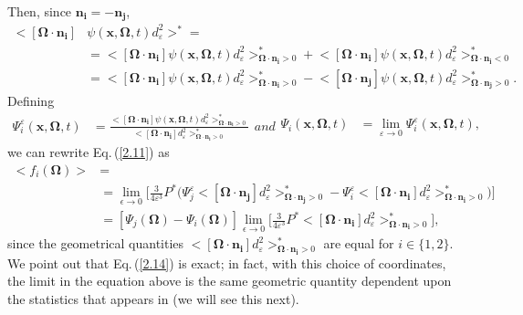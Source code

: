 \documentclass[12pt]{article}
\newcommand{\ep}{\varepsilon}
\newcommand{\bl}{\big<}
\newcommand{\bg}{\big>}
\begin{document}
Then, since $\bm{n_i} = -\bm{n_j}$,
\begin{equation}
\begin{split}
\bigg<[\bm\Omega\cdot\bm{n_i}]
&\psi(\bm x,\bm\Omega,t) d_{\ep}^2 \bigg>^* =
\\& = \bigg<[\bm\Omega\cdot\bm{n_i}]
\psi(\bm x,\bm\Omega,t) d_{\ep}^2 \bigg>_{\bm\Omega\cdot\bm{n_i}>0}^*+
 \bigg<[\bm\Omega\cdot\bm{n_i}]
\psi(\bm x,\bm\Omega,t) d_{\ep}^2 \bigg>_{\bm\Omega\cdot\bm{n_i}<0}^*
\\& = \bigg<[\bm\Omega\cdot\bm{n_i}]
\psi(\bm x,\bm\Omega,t) d_{\ep}^2 \bigg>_{\bm\Omega\cdot\bm{n_i}>0}^*-
 \bigg<[\bm\Omega\cdot\bm{n_j}]
\psi(\bm x,\bm\Omega,t) d_{\ep}^2 \bigg>_{\bm\Omega\cdot\bm{n_j}>0}^*.
\end{split}
\end{equation}
Defining
\begin{subequations}
\begin{align}
\Psi_i^{\ep}(\bm x,\bm\Omega,t) &= \frac{\bl[\bm\Omega\cdot\bm{n_i}]\psi(\bm x,\bm\Omega,t)
d_{\ep}^2\bg^*_{\bm\Omega\cdot\bm{n_i}>0}}
{\bl[\bm\Omega\cdot\bm{n_i}]d_{\ep}^2\bg^*_{\bm\Omega\cdot\bm{n_i}>0}}
\end{align}
and
\begin{align}
\Psi_i(\bm x,\bm\Omega,t) &= \displaystyle{\lim_{\ep\rightarrow 0}}\Psi_i^{\ep}(\bm x,\bm\Omega,t),  
\end{align}
\end{subequations}
 we can rewrite Eq.$\,$(\ref{2.11}) as
\begin{equation}\label{2.14}
\begin{split}
\bl f_i (\bm\Omega) \bg &= \\&= \lim_{\epsilon\rightarrow 0}
\bigg[\frac{3}{4\ep^3}P^*\bigg(\Psi_j^\ep
\bl[\bm\Omega\cdot \bm{n_j}]d_{\ep}^2\bg^*_{\bm\Omega\cdot\bm{n_j}>0}
-\Psi_i^{\ep}\bl[\bm\Omega\cdot\bm{n_i}]d_{\ep}^2\bg^*_{\bm\Omega\cdot\bm{n_i}>0}\bigg)\bigg]
\\& = [\Psi_j(\bm\Omega) - \Psi_i(\bm\Omega)]\lim_{\epsilon\rightarrow 0}
\bigg[\frac{3}{4\ep^3}P^*\bl[\bm\Omega\cdot \bm{n_i}]d_{\ep}^2\bg^*_{\bm\Omega\cdot\bm{n_i}>0}\bigg],
\end{split}
\end{equation}
since the geometrical quantities $\bl [\bm\Omega\cdot\bm{n_i}]d_\ep^2 \bg^*_{\bm\Omega\cdot\bm{n_i}>0}$ are equal for $i\in\{1,2\}$.
We point out that Eq.$\,$(\ref{2.14}) is exact; in fact, with this choice of coordinates, the limit in the equation above is the same geometric quantity dependent upon the statistics that appears in \cite{adams_89} (we will see this next). 
\end{document}
